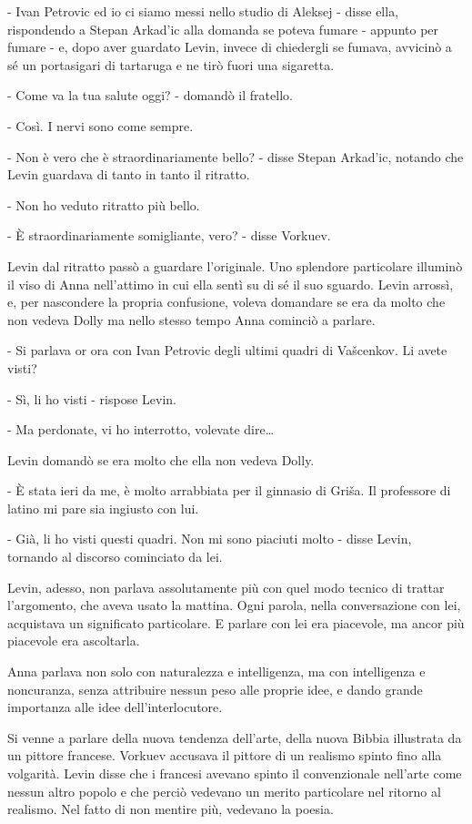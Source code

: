 - Ivan Petrovic ed io ci siamo messi nello studio di Aleksej - disse ella, rispondendo a Stepan Arkad'ic alla domanda se poteva fumare - appunto per fumare - e, dopo aver guardato Levin, invece di chiedergli se fumava, avvicinò a sé un portasigari di tartaruga e ne tirò fuori una sigaretta. 

- Come va la tua salute oggi? - domandò il fratello. 

- Così. I nervi sono come sempre. 

- Non è vero che è straordinariamente bello? - disse Stepan Arkad'ic, notando che Levin guardava di tanto in tanto il ritratto. 

- Non ho veduto ritratto più bello. 

- È straordinariamente somigliante, vero? - disse Vorkuev. 

Levin dal ritratto passò a guardare l'originale. Uno splendore particolare illuminò il viso di Anna nell'attimo in cui ella sentì su di sé il suo sguardo. Levin arrossì, e, per nascondere la propria confusione, voleva domandare se era da molto che non vedeva Dolly ma nello stesso tempo Anna cominciò a parlare. 

- Si parlava or ora con Ivan Petrovic degli ultimi quadri di Vašcenkov. Li avete visti? 

- Sì, li ho visti - rispose Levin. 

- Ma perdonate, vi ho interrotto, volevate dire\ldots{} 

Levin domandò se era molto che ella non vedeva Dolly. 

- È stata ieri da me, è molto arrabbiata per il ginnasio di Griša. Il professore di latino mi pare sia ingiusto con lui. 

- Già, li ho visti questi quadri. Non mi sono piaciuti molto - disse Levin, tornando al discorso cominciato da lei. 

Levin, adesso, non parlava assolutamente più con quel modo tecnico di trattar l'argomento, che aveva usato la mattina. Ogni parola, nella conversazione con lei, acquistava un significato particolare. E parlare con lei era piacevole, ma ancor più piacevole era ascoltarla. 

Anna parlava non solo con naturalezza e intelligenza, ma con intelligenza e noncuranza, senza attribuire nessun peso alle proprie idee, e dando grande importanza alle idee dell'interlocutore. 

Si venne a parlare della nuova tendenza dell'arte, della nuova Bibbia illustrata da un pittore francese. Vorkuev accusava il pittore di un realismo spinto fino alla volgarità. Levin disse che i francesi avevano spinto il convenzionale nell'arte come nessun altro popolo e che perciò vedevano un merito particolare nel ritorno al realismo. Nel fatto di non mentire più, vedevano la poesia. 

